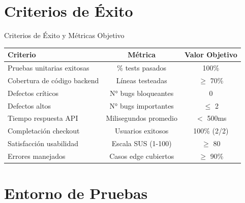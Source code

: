 \documentclass[aspectratio=169]{beamer}
\begin{document}
\section{Criterios de Éxito}

\begin{frame}{Criterios de Éxito y Métricas Objetivo}
\begin{table}
\small
\begin{tabular}{lcc}
\toprule
\textbf{Criterio} & \textbf{Métrica} & \textbf{Valor Objetivo} \\
\midrule
Pruebas unitarias exitosas & \% tests pasados & 100\% \\
Cobertura de código backend & Líneas testeadas & $\geq$ 70\% \\
Defectos críticos & N° bugs bloqueantes & 0 \\
Defectos altos & N° bugs importantes & $\leq$ 2 \\
Tiempo respuesta API & Milisegundos promedio & $<$ 500ms \\
Completación checkout & Usuarios exitosos & 100\% (2/2) \\
Satisfacción usabilidad & Escala SUS (1-100) & $\geq$ 80 \\
Errores manejados & Casos edge cubiertos & $\geq$ 90\% \\
\bottomrule
\end{tabular}
\end{table}
\end{frame}

\section{Entorno de Pruebas}
\end{document}
